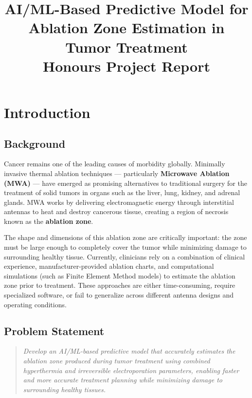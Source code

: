 \documentclass[12pt, a4paper]{article}
\title{
    \vspace{-1cm}
    \textbf{\LARGE AI/ML-Based Predictive Model for Ablation Zone Estimation in Tumor Treatment}\\[0.8em]
    \large Honours Project Report
}
\author{}
\date{}
\begin{document}
\maketitle
\thispagestyle{fancy}

\tableofcontents
\newpage

\section{Introduction}
\label{sec:introduction}

\subsection{Background}
\label{sec:background}

Cancer remains one of the leading causes of morbidity globally. Minimally invasive thermal ablation techniques --- particularly \textbf{Microwave Ablation (MWA)} --- have emerged as promising alternatives to traditional surgery for the treatment of solid tumors in organs such as the liver, lung, kidney, and adrenal glands. MWA works by delivering electromagnetic energy through interstitial antennas to heat and destroy cancerous tissue, creating a region of necrosis known as the \textbf{ablation zone}.

The shape and dimensions of this ablation zone are critically important: the zone must be large enough to completely cover the tumor while minimizing damage to surrounding healthy tissue. Currently, clinicians rely on a combination of clinical experience, manufacturer-provided ablation charts, and computational simulations (such as Finite Element Method models) to estimate the ablation zone prior to treatment. These approaches are either time-consuming, require specialized software, or fail to generalize across different antenna designs and operating conditions.

\subsection{Problem Statement}
\label{sec:problem-statement}

\begin{quote}
\textit{Develop an AI/ML-based predictive model that accurately estimates the ablation zone produced during tumor treatment using combined hyperthermia and irreversible electroporation parameters, enabling faster and more accurate treatment planning while minimizing damage to surrounding healthy tissues.}
\end{quote}
\end{document}
